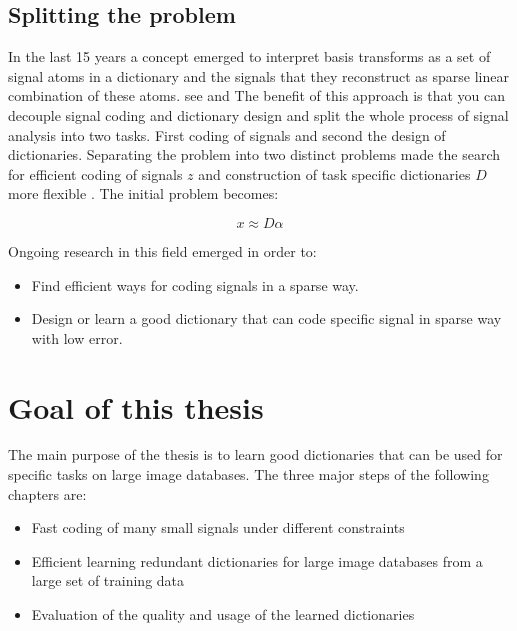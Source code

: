 \subsection{Splitting the problem}
\cite{Rubinstein2010}
In the last 15 years a concept emerged to interpret basis transforms as a set of signal atoms in a dictionary and the signals 
that they reconstruct as sparse linear combination of these atoms.
see \cite{Olshausen1996} and \cite{Mallat1993}
The benefit of this approach is that you can decouple signal coding and dictionary design and split the whole process of signal analysis into two tasks.
First coding of signals and second the design of dictionaries.
Separating the problem into two distinct problems made the search for efficient coding of signals $z$ and construction of task specific dictionaries $D$ more flexible \cite{?}.
The initial problem becomes:

\begin{equation}
 x \approx D\alpha
\end{equation}


Ongoing research in this field emerged in order to:
\begin{itemize}
 \item Find efficient ways for coding signals in a sparse way.
 \item Design or learn a good dictionary that can code specific signal in sparse way with low error.
\end{itemize}


\section{Goal of this thesis}

The main purpose of the thesis is to learn good dictionaries that can be used for specific tasks on large image databases.
The three major steps of the following chapters are:
\begin{itemize}
 \item Fast coding of many small signals under different constraints
 \item Efficient learning redundant dictionaries for large image databases from a large set of training data
 \item Evaluation of the quality and usage of the learned dictionaries
\end{itemize}

